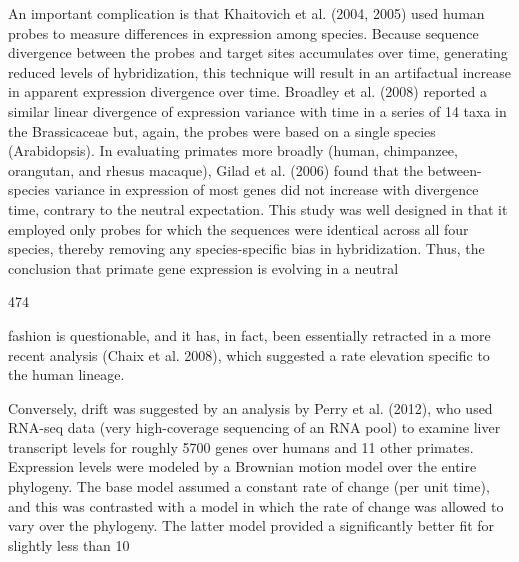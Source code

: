 \documentclass{article}
\begin{document}
An important complication is that Khaitovich et al. (2004, 2005) used human probes to measure differences in expression among species. Because sequence divergence between the probes and target sites accumulates over time, generating reduced levels of hybridization, this technique will result in an artifactual increase in apparent expression divergence over time. Broadley et al. (2008) reported a similar linear divergence of expression variance with time in a series of 14 taxa in the Brassicaceae but, again, the probes were based on a single species (Arabidopsis). In evaluating primates more broadly (human, chimpanzee, orangutan, and rhesus macaque), Gilad et al. (2006) found that the between-species variance in expression of most genes did not increase with divergence time, contrary to the neutral expectation. This study was well designed in that it employed only probes for which the sequences were identical across all four species, thereby removing any species-specific bias in hybridization. Thus, the conclusion that primate gene expression is evolving in a neutral

474

fashion is questionable, and it has, in fact, been essentially retracted in a more recent analysis (Chaix et al. 2008), which suggested a rate elevation specific to the human lineage.

Conversely, drift was suggested by an analysis by Perry et al. (2012), who used RNA-seq data (very high-coverage sequencing of an RNA pool) to examine liver transcript levels for roughly 5700 genes over humans and 11 other primates. Expression levels were modeled by a Brownian motion model over the entire phylogeny. The base model assumed a constant rate of change (per unit time), and this was contrasted with a model in which the rate of change was allowed to vary over the phylogeny. The latter model provided a significantly better fit for slightly less than 10%
\end{document}
